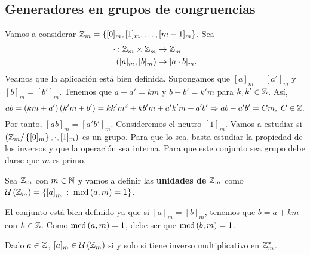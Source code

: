 \subsection{Generadores en grupos de congruencias}
Vamos a considerar $\displaystyle \mathbb{Z}_{m} = \left\{ [0]_{m}, [1]_{m}, \ldots, [m - 1]_{m}\right\}  $. Sea 
\[
\begin{split}
	\cdot : \mathbb{Z}_{m}\times \mathbb{Z}_{m} & \to \mathbb{Z}_{m} \\
	\left([a]_{m},[b]_{m}\right) & \to [a \cdot b]_{m}.
\end{split}
\]
Veamos que la aplicación está bien definida. Supongamos que $\displaystyle [a]_{m} = [a']_{m} $ y $\displaystyle [b]_{m} = [b']_{m} $. Tenemos que $\displaystyle a - a' = km  $ y $\displaystyle b -b' = k'm $ para $\displaystyle k,k' \in \mathbb{Z} $. Así,
\[ab = \left(km + a'\right)\left(k'm+b'\right) = k k' m^{2} + kb'm + a'k'm + a'b' \Rightarrow ab - a'b' = Cm, \; C \in \mathbb{Z} .\]
Por tanto, $\displaystyle [ab]_{m} = [a'b']_{m} $. Consideremos el neutro $\displaystyle [1]_{m} $. Vamos a estudiar si $\displaystyle \left(\mathbb{Z}_{m}/ \left\{ [0]_{m}\right\} , \cdot , [1]_{m}\right) $ es un grupo. Para que lo sea, basta estudiar la propiedad de los inversos y que la operación sea interna. Para que este conjunto sea grupo debe darse que $\displaystyle m $ es primo. 
\begin{definition}
	Sea $\displaystyle \mathbb{Z}_{m} $ con $\displaystyle m \in \mathbb{N} $ y vamos a definir las \textbf{unidades de} $\displaystyle \mathbb{Z}_{m} $ como $\displaystyle \mathcal{U}\left(\mathbb{Z}_{m}\right) = \left\{ \left[a\right] _{m} \; : \; \text{mcd}\left(a,m\right) = 1\right\}  $. 
\end{definition}
\begin{observation}
	El conjunto está bien definido ya que si $\displaystyle [a]_{m} = [b]_{m} $, tenemos que $\displaystyle b = a + km $ con $\displaystyle k \in \mathbb{Z} $. Como $\displaystyle \text{mcd}\left(a,m\right) = 1 $, debe ser que $\displaystyle \text{mcd}\left(b,m\right) = 1 $.  
\end{observation}
\begin{lema}
	Dado $\displaystyle a \in \mathbb{Z} $, $\displaystyle [a]_{m} \in \mathcal{U}\left(\mathbb{Z}_{m}\right) $ si y solo si tiene inverso multiplicativo en $\displaystyle \mathbb{Z}_{m}^{*} $. 
\end{lema}
